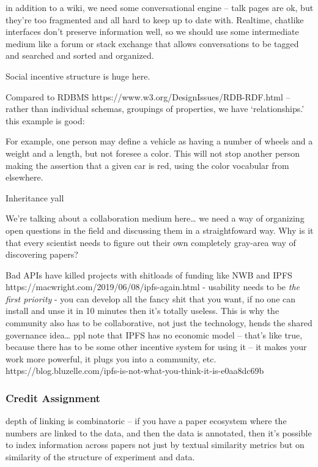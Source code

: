 \documentclass[nohyper]{tufte-book-jls}
\begin{document}
in addition to a wiki, we need some conversational engine -- talk pages
are ok, but they're too fragmented and all hard to keep up to date with.
Realtime, chatlike interfaces don't preserve information well, so we
should use some intermediate medium like a forum or stack exchange that
allows conversations to be tagged and searched and sorted and organized.

Social incentive structure is huge here.

Compared to RDBMS https://www.w3.org/DesignIssues/RDB-RDF.html -- rather
than individual schemas, groupings of properties, we have
`relationships.' this example is good:

\begin{leftbar}
For example, one person may define a vehicle as having a number of
wheels and a weight and a length, but not foresee a color. This will not
stop another person making the assertion that a given car is red, using
the color vocabular from elsewhere.
\end{leftbar}

Inheritance yall

We're talking about a collaboration medium here\ldots{} we need a way of
organizing open questions in the field and discussing them in a
straightfoward way. Why is it that every scientist needs to figure out
their own completely gray-area way of discovering papers?

Bad APIs have killed projects with shitloads of funding like NWB and
IPFS https://macwright.com/2019/06/08/ipfs-again.html - usability needs
to be \emph{the first priority} - you can develop all the fancy shit
that you want, if no one can install and unse it in 10 minutes then it's
totally useless. This is why the community also has to be collaborative,
not just the technology, hends the shared governance idea\ldots{} ppl
note that IPFS has no economic model -- that's like true, because there
has to be some other incentive system for using it -- it makes your work
more powerful, it plugs you into a community, etc.
https://blog.bluzelle.com/ipfs-is-not-what-you-think-it-is-e0aa8dc69b

\hypertarget{credit-assignment}{%
\subsubsection{Credit Assignment}\label{credit-assignment}}

depth of linking is combinatoric -- if you have a paper ecosystem where
the numbers are linked to the data, and then the data is annotated, then
it's possible to index information across papers not just by textual
similarity metrics but on similarity of the structure of experiment and
data.
\end{document}
